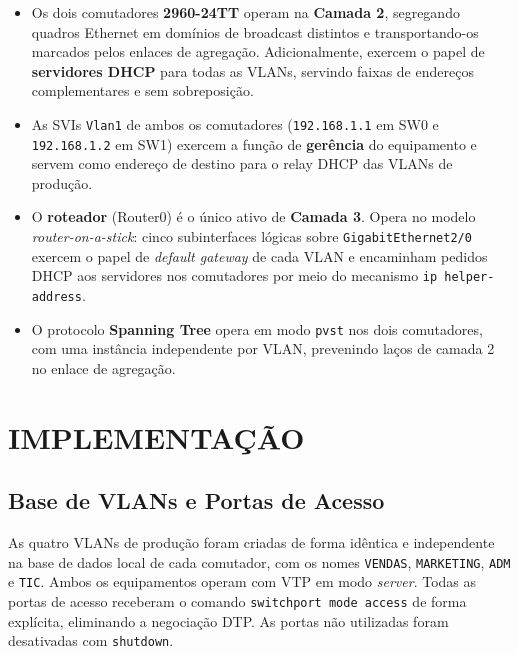 \documentclass[12pt,a4paper]{article}
\begin{document}
\begin{itemize}[leftmargin=2em]
  \item Os dois comutadores \textbf{2960-24TT} operam na \textbf{Camada 2}, segregando
        quadros Ethernet em domínios de broadcast distintos e transportando-os marcados
        pelos enlaces de agregação. Adicionalmente, exercem o papel de
        \textbf{servidores DHCP} para todas as VLANs, servindo faixas de endereços
        complementares e sem sobreposição.

  \item As SVIs \texttt{Vlan1} de ambos os comutadores
        (\texttt{192.168.1.1} em SW0 e \texttt{192.168.1.2} em SW1) exercem a
        função de \textbf{gerência} do equipamento e servem como endereço de destino
        para o relay DHCP das VLANs de produção.

  \item O \textbf{roteador} (Router0) é o único ativo de \textbf{Camada 3}. Opera
        no modelo \textit{router-on-a-stick}: cinco subinterfaces lógicas sobre
        \texttt{GigabitEthernet2/0} exercem o papel de \textit{default gateway}
        de cada VLAN e encaminham pedidos DHCP aos servidores nos comutadores
        por meio do mecanismo \texttt{ip helper-address}.

  \item O protocolo \textbf{Spanning Tree} opera em modo \texttt{pvst} nos dois
        comutadores, com uma instância independente por VLAN, prevenindo laços de
        camada 2 no enlace de agregação.
\end{itemize}

\section{IMPLEMENTAÇÃO}

\subsection{Base de VLANs e Portas de Acesso}

As quatro VLANs de produção foram criadas de forma idêntica e independente na base de
dados local de cada comutador, com os nomes \texttt{VENDAS}, \texttt{MARKETING},
\texttt{ADM} e \texttt{TIC}. Ambos os equipamentos operam com VTP em modo
\textit{server}. Todas as portas de acesso receberam o comando
\texttt{switchport mode access} de forma explícita, eliminando a negociação DTP.
As portas não utilizadas foram desativadas com \texttt{shutdown}.
\end{document}
